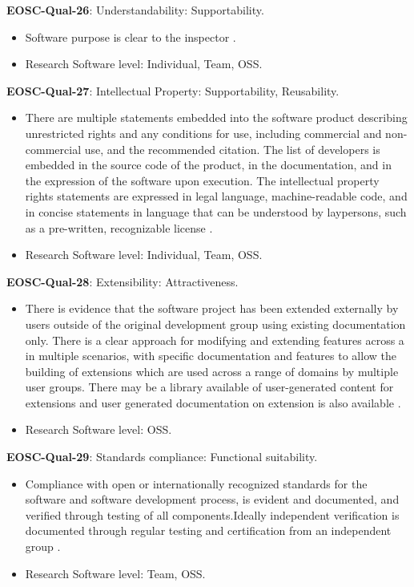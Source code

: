 \textbf{EOSC-Qual-26}: Understandability: Supportability.

\begin{itemize}
    \item Software purpose is clear to the inspector \cite{boehm_quantitative_1976}.
    \item Research Software level: Individual, Team, OSS.
\end{itemize}

\textbf{EOSC-Qual-27}: Intellectual Property: Supportability, Reusability.

\begin{itemize}
    \item There are multiple statements embedded into the software product describing unrestricted rights and any conditions for use, including commercial and non-commercial use, and the recommended citation. The list of developers is embedded in the source code of the product, in the documentation, and in the expression of the software upon execution. The intellectual property rights statements are expressed in legal language, machine-readable code, and in concise statements in language that can be understood by laypersons, such as a pre-written, recognizable license \cite{shepherdson_cessda_2019}.
    \item Research Software level: Individual, Team, OSS.
\end{itemize}

\textbf{EOSC-Qual-28}: Extensibility: Attractiveness.

\begin{itemize}
    \item There is evidence that the software project has been extended externally by users outside of the original development group using existing documentation only. There is a clear approach for modifying and extending features across a in multiple scenarios, with specific documentation and features to allow the building of extensions which are used across a range of domains by multiple user groups. There may be a library available of user-generated content for extensions and user generated documentation on extension is also available \cite{shepherdson_cessda_2019}.
    \item Research Software level: OSS.
\end{itemize}

\textbf{EOSC-Qual-29}: Standards compliance: Functional suitability.

\begin{itemize}
    \item Compliance with open or internationally recognized standards for the software and software development process, is evident and documented, and verified through testing of all components.Ideally independent verification is documented through regular testing and certification from an independent group \cite{shepherdson_cessda_2019}.
    \item Research Software level: Team, OSS.
\end{itemize}

